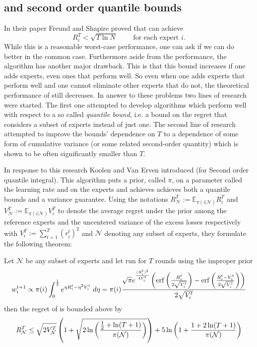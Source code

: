 \subsection{\squint and second order quantile bounds}
\label{subsec:squint}
In their paper \cite{Freund1997} Freund and Shapire proved  that \hedge can achieve $$R^T_i < \sqrt{T \ln N}\qquad \text{ for each expert } i.$$ While this is a reasonable worst-case performance, one can ask if we can do better in the common case. Furthermore aside from the performance, the algorithm has another major drawback. This is that this bound increases if one adds experts, even ones that perform well. So even when one adds experts that perform well and one cannot eliminate other experts that do not, the theoretical performance of \hedge still decreases. 
In answer to these problems two lines of research were started. The first one attempted to develop algorithms which perform well with respect to a so called \textit{quantile bound}, i.e. a bound on the regret that considers a subset of experts instead of just one. The second line of research attempted to improve the bounds' dependence on $T$ to a dependence of some form of cumulative variance (or some related second-order quantity) which is shown to be often significantly smaller than $T$. 

\par In response to this research Koolen and Van Erven introduced \squint\cite{Koolen2015} (for Second order quantile integral). This algorithm puts a prior, called $\pi$, on a parameter called the learning rate and on the experts and achieves achieves both a quantile bounds and a variance guarantee. Using the notations $R^T_\mathcal{N} := \mathbb{E}_{\pi(i|\mathcal N)}R^T_i$ and  $V^T_\mathcal{N} := \mathbb{E}_{\pi(i|\mathcal N)}V^T_i$ to denote the average regret under the prior among the reference experts and the uncentered variance of the excess losses respectively with $V^T_i := \sum^T_{t=1}(r^t_i)^2$ and $\mathcal N$ denoting any subset of experts, they formulate the following theorem:

 \begin{theorem}\label{Thm:SquintPerf}\cite{Koolen2015}
 Let $\mathcal{N}$ be any subset of experts and let \squint run for $T$ rounds using the improper prior
  $$w^{t+1}_i \propto \pi(i)\int_0^{\frac12}e^{\eta R^t_i-\eta^2V_i^t} \;d\eta=\pi(i) \frac{\sqrt{\pi}e^{\frac{(R^t_i)^2}{4V^t_i}}\left(\operatorname{erf}\left(\frac{R^t_i}{2\sqrt{V_i^t}}\right)-\operatorname{erf}\left(\frac{R_i^t-V_i^t}{2\sqrt{V_i^t}}\right)\right)}{2\sqrt{V_i^t}}$$
  then the regret of \squint is bounded above by
  $$R^T_\mathcal{N}\leq \sqrt{2V^T_\mathcal N}\left(1+\sqrt{2\ln\left(\frac{\frac12+\ln(T+1)}{\pi(\mathcal{N})}\right)}\right)+5\ln\left(1+\frac{1+2\ln(T+1)}{\pi(\mathcal N)}\right)$$

 \end{theorem}

